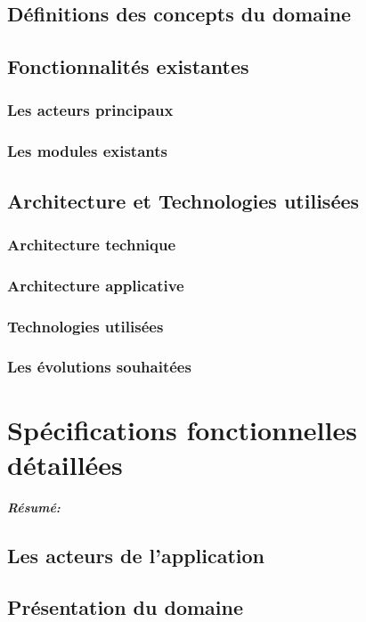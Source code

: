 \documentclass[a4paper, 12pt]{report}
\begin{document}
\section{Définitions des concepts du domaine}

\section{Fonctionnalités existantes}

\subsection{Les acteurs principaux}
\subsection{Les modules existants}


\section{Architecture et Technologies utilisées}
\subsection{Architecture technique}
\subsection{Architecture applicative}
\subsection{Technologies utilisées}
\subsection{Les évolutions souhaitées}


\chapter{Spécifications fonctionnelles détaillées}
\textit{\textbf{Résumé:}}
\setcounter{minitocdepth}{2}
\minitoc
\section{Les acteurs de l'application}
\section{Présentation du domaine}
\end{document}
